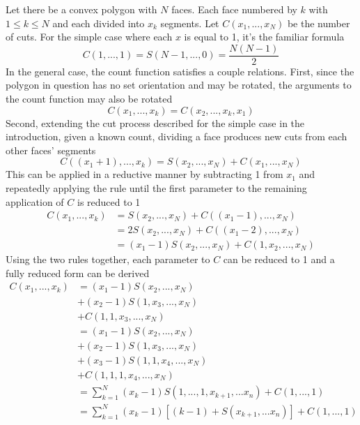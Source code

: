 \documentclass[12pt]{article}
\begin{document}
Let there be a convex polygon with $N$ faces. Each face numbered by $k$ with
$1 \le k \le N$ and each divided into $x_k$ segments.
Let $C(x_1,...,x_N)$ be the number of
cuts. For the simple case where each $x$ is equal to 1, it's the familiar
formula
\begin{equation}
    C(1,...,1) = S(N-1,...,0) = \frac{N (N - 1)}{2}
\end{equation}
In the general case, the count function satisfies a couple relations. First,
since the polygon in question has no set orientation and may be rotated, the
arguments to the count function may also be rotated
\begin{equation}
    C(x_1,...,x_k) = C(x_2,...,x_k,x_1)
\end{equation}
Second, extending the cut process described for the simple case in the introduction,
given a known count, dividing a face produces new cuts from each other faces'
segments
\begin{equation}
    C((x_1 + 1),...,x_k) = S(x_2,...,x_N) + C(x_1,...,x_N)
\end{equation}
This can be applied in a reductive manner by subtracting 1 from $x_1$
and repeatedly applying the rule until the first parameter to the
remaining application of $C$ is reduced to 1
\begin{equation}
\begin{aligned}
    C(x_1,...,x_k) &=           S(x_2,...,x_N) + C((x_1 - 1),...,x_N) \\
                   &=         2 S(x_2,...,x_N) + C((x_1 - 2),...,x_N) \\
                   &= (x_1 - 1) S(x_2,...,x_N) + C(1,x_2,...,x_N)
\end{aligned}
\end{equation}
Using the two rules together, each parameter to $C$ can be reduced to 1
and a fully reduced form can be derived
\begin{equation}
\begin{aligned}
    C(x_1,...,x_k) &= (x_1 - 1) S(x_2,...,x_N) \\
                   &+ (x_2 - 1) S(1,x_3,...,x_N) \\
                   &+ C(1,1,x_3,...,x_N) \\
                   &= (x_1 - 1) S(x_2,...,x_N) \\
                   &+ (x_2 - 1) S(1,x_3,...,x_N) \\
                   &+ (x_3 - 1) S(1,1,x_4,...,x_N) \\
                   &+ C(1,1,1,x_4,...,x_N) \\
                   &= \sum_{k=1}^{N} (x_k - 1) S(1,...,1,x_{k+1},...x_n) + C(1,...,1) \\
                   &= \sum_{k=1}^{N} (x_k - 1) \left[ (k-1) + S(x_{k+1},...x_n) \right] + C(1,...,1) \\
\end{aligned}
\end{equation}
\end{document}
